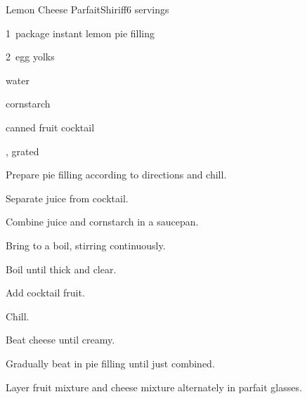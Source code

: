 \begin{recipe}{Lemon Cheese Parfait}{Shiriff}{6 servings}

\begin{ingredients}
\item 1~package instant lemon pie filling
\item 2~egg yolks
\item \C{2\half} water
\item {} cornstarch
\item {} canned fruit cocktail
\item {} , grated
\end{ingredients}

\begin{directions}
\item Prepare pie filling according to directions and chill.
\item Separate juice from cocktail.
\item Combine juice and cornstarch in a saucepan.
\item Bring to a boil, stirring continuously.
\item Boil until thick and clear.
\item Add cocktail fruit.
\item Chill.
\item Beat cheese until creamy.
\item Gradually beat in pie filling until just combined.
\item Layer fruit mixture and cheese mixture alternately in parfait glasses.
\end{directions}

\end{recipe}
